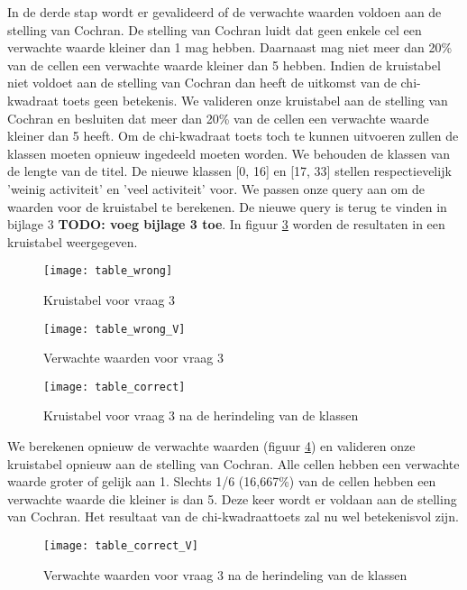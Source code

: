 In de derde stap wordt er gevalideerd of de verwachte waarden voldoen aan de stelling van Cochran. De stelling van Cochran luidt dat geen enkele cel een verwachte waarde kleiner dan 1 mag hebben. Daarnaast mag niet meer dan 20\% van de cellen een verwachte waarde kleiner dan 5 hebben. Indien de kruistabel niet voldoet aan de stelling van Cochran dan heeft de uitkomst van de chi-kwadraat toets geen betekenis. We valideren onze kruistabel aan de stelling van Cochran en besluiten dat meer dan 20\% van de cellen een verwachte waarde kleiner dan 5 heeft. Om de chi-kwadraat toets toch te kunnen uitvoeren zullen de klassen moeten opnieuw ingedeeld moeten worden. We behouden de klassen van de lengte van de titel. De nieuwe klassen [0, 16] en [17, 33] stellen respectievelijk 'weinig activiteit' en 'veel activiteit' voor. We passen onze query aan om de waarden voor de kruistabel te berekenen. De nieuwe query is terug te vinden in bijlage 3 \textbf{TODO: voeg bijlage 3 toe}. In figuur \ref{fig:tablecorrect} worden de resultaten in een kruistabel weergegeven.


\begin{figure}
	\centering
	\texttt{[image: table\_wrong]}
	\caption{Kruistabel voor vraag 3}
	\label{fig:tablewrong}
\end{figure}

\begin{figure}
	\centering
	\texttt{[image: table\_wrong\_V]}
	\caption{Verwachte waarden voor vraag 3}
	\label{fig:tablewrongV}
\end{figure}

\begin{figure}
	\centering
	\texttt{[image: table\_correct]}
	\caption{Kruistabel voor vraag 3 na de herindeling van de klassen}
	\label{fig:tablecorrect}
\end{figure}

We berekenen opnieuw de verwachte waarden (figuur \ref{fig:tablecorrectV}) en valideren onze kruistabel opnieuw aan de stelling van Cochran. Alle cellen hebben een verwachte waarde groter of gelijk aan 1. Slechts 1/6 (16,667\%) van de cellen hebben een verwachte waarde die kleiner is dan 5. Deze keer wordt er voldaan aan de stelling van Cochran. Het resultaat van de chi-kwadraattoets zal nu wel betekenisvol zijn.


\begin{figure}
	\centering
	\texttt{[image: table\_correct\_V]}
	\caption{Verwachte waarden voor vraag 3 na de herindeling van de klassen}
	\label{fig:tablecorrectV}
\end{figure}


